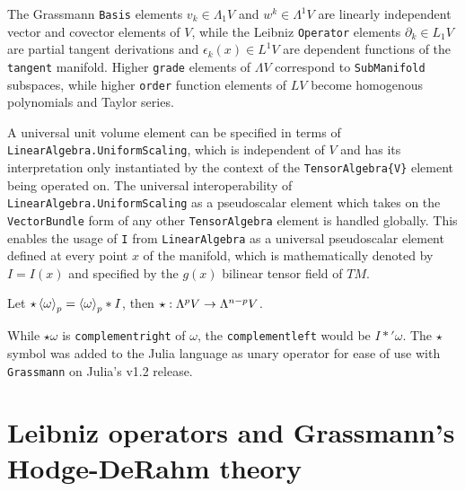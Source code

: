 \documentclass{juliacon}
\begin{document}
The Grassmann \verb`Basis` elements $v_k\in\Lambda_1V$ and $w^k\in\Lambda^1V$ are linearly independent vector and covector elements of $V$, while the Leibniz \verb`Operator` elements $\partial_k\in L_1V$ are partial tangent derivations and $\epsilon_k(x)\in L^1V$ are dependent functions of the \verb`tangent` manifold. 
Higher \verb`grade` elements of $\Lambda V$ correspond to \verb`SubManifold` subspaces, while higher \verb`order` function elements of $LV$ become homogenous polynomials and Taylor series.


A universal unit volume element can be specified in terms of \verb`LinearAlgebra.UniformScaling`, which is independent of $V$ and has its interpretation only instantiated by the context of the \verb`TensorAlgebra{V}` element being operated on.
The universal interoperability of \verb`LinearAlgebra.UniformScaling` as a pseudoscalar element which takes on the \verb`VectorBundle` form of any other \verb`TensorAlgebra` element is handled globally. 
This enables the usage of \verb`I` from \verb`LinearAlgebra` as a universal pseudoscalar element defined at every point $x$ of the manifold, which is mathematically denoted by $I=I(x)$ and specified by the $g(x)$ bilinear tensor field of $TM$.

\begin{definition}
	Let $\star\left\langle \omega \right\rangle_p = \left\langle \omega \right\rangle_p\ast I$, %
	 then $\star : \Lambda^pV\rightarrow\Lambda^{n-p}V$.
\end{definition}
\begin{remark}
	While $\star\omega$ is \verb`complementright` of $\omega$, the \verb`complementleft` would be $I\ast'\omega$. The $\star$ symbol was added to the Julia language as unary operator for ease of use with \verb`Grassmann` on Julia's v1.2 release.
\end{remark}

\section{Leibniz operators and Grassmann's Hodge-DeRahm theory}
\end{document}
